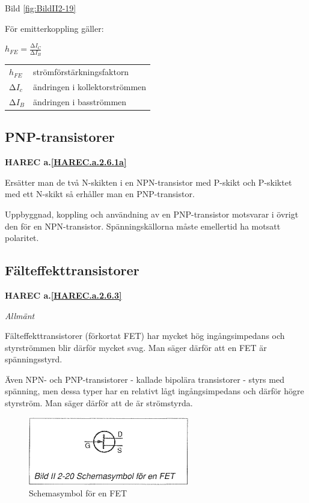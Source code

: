 Bild \ref{fig:BildII2-19}

För emitterkoppling gäller:

\(h_{FE} = \frac{∆I_C}{∆I_B}\)

\begin{tabular}{ll}
  \(h_{FE}\) & strömförstärkningsfaktorn \\
  \(∆I_c\)   & ändringen i kollektorströmmen \\
  \(∆I_B\)   & ändringen i basströmmen \\
\end{tabular}

\subsection{PNP-transistorer}
\textbf{HAREC a.\ref{HAREC.a.2.6.1a}\label{myHAREC.a.2.6.1a}}

Ersätter man de två N-skikten i en NPN-transistor med P-skikt och P-skiktet med
ett N-skikt så erhåller man en PNP-transistor.

Uppbyggnad, koppling och användning av en PNP-transistor motsvarar i övrigt den
för en NPN-transistor. Spänningskällorna måste emellertid ha motsatt polaritet.

\subsection{Fälteffekttransistorer}
\textbf{HAREC a.\ref{HAREC.a.2.6.3}\label{myHAREC.a.2.6.3}}

\emph{Allmänt}

Fälteffekttransistorer (förkortat FET) har mycket hög ingångsimpedans och
styrströmmen blir därför mycket svag. Man säger därför att en FET är
spänningsstyrd.

Även NPN- och PNP-transistorer - kallade bipolära transistorer - styrs med
spänning, men dessa typer har en relativt lågt ingångsimpedans och därför högre
styrström. Man säger därför att de är strömstyrda.

\begin{figure}[h]
\begin{center}
\includegraphics[width=7cm]{images/bild_2_2-20}
\caption{Schemasymbol för en FET}
\label{fig:BildII2-20}
\end{center}
\end{figure}

